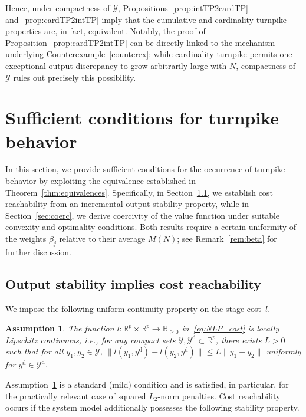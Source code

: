 \documentclass[a4paper,fleqn]{cas-dc}
\newtheorem{ass}{Assumption}
\begin{document}
Hence, under compactness of \(\mathcal Y\), Propositions~\ref{prop:intTP2cardTP} and~\ref{prop:cardTP2intTP} imply that the cumulative and cardinality turnpike properties are, in fact, equivalent.
Notably, the proof of Proposition~\ref{prop:cardTP2intTP} can be directly linked to the mechanism underlying Counterexample~\ref{counterex}: while cardinality turnpike permits one exceptional output discrepancy to grow arbitrarily large with \(N\), compactness of \(\mathcal Y\) rules out precisely this possibility.




\section{Sufficient conditions for turnpike behavior}\label{sec:sysid_practice}

In this section, we provide sufficient conditions for the occurrence of turnpike behavior by exploiting the equivalence established in Theorem~\ref{thm:equivalences}.
Specifically, in Section~\ref{sec:reachability}, we establish cost reachability from an incremental output stability property, while in Section~\ref{sec:coerc}, we derive coercivity of the value function under suitable convexity and optimality conditions. Both results require a certain uniformity of the weights $\beta_j$ relative to their average $M(N)$; see Remark~\ref{rem:beta} for further discussion.

\subsection{Output stability implies cost reachability}
\label{sec:reachability}

We impose the following uniform continuity property on the stage cost~$l$.

\begin{ass}\label{ass:Lipschitz}
	The function $l:\mathbb{R}^p\times\mathbb{R}^p\rightarrow\mathbb{R}_{\geq0}$ in~\eqref{eq:NLP_cost} is locally Lipschitz continuous, i.e., for any compact sets $\mathcal{Y},\mathcal{Y}^\mathrm{d}\subset \mathbb{R}^p$, there exists $L>0$ such that for all $y_1,y_2\in\mathcal{Y}$, $\|l(y_1,y^\mathrm{d})-l(y_2,y^\mathrm{d})\| \leq L\|y_1-y_2\|$ uniformly for $y^\mathrm{d}\in\mathcal{Y}^\mathrm{d}$.
\end{ass}

Assumption~\ref{ass:Lipschitz} is a standard (mild) condition and is satisfied, in particular, for the practically relevant case of squared $L_2$-norm penalties.
Cost reachability occurs if the system  model additionally possesses the following stability property.
\end{document}

